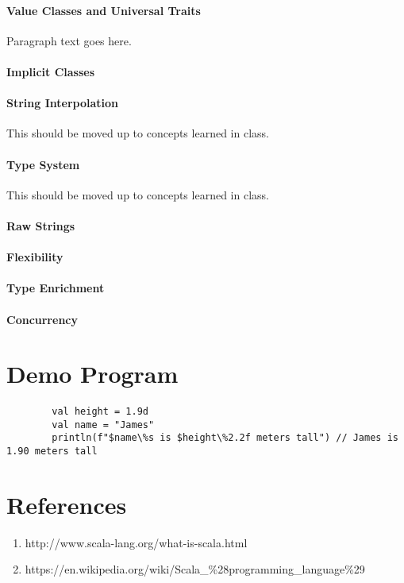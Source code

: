 \documentclass[12pt]{article}
\begin{document}
		\paragraph{Value Classes and Universal Traits} Paragraph text goes here.

		\paragraph{Implicit Classes}

		\paragraph{String Interpolation} This should be moved up to concepts learned in class.

		\paragraph{Type System}This should be moved up to concepts learned in class.
		
		\paragraph{Raw Strings}

		\paragraph{Flexibility}

		\paragraph{Type Enrichment}

		\paragraph{Concurrency}

\section{Demo Program}
	\paragraph{}

	\begin{lstlisting}
		val height = 1.9d
		val name = "James"
		println(f"$name\%s is $height\%2.2f meters tall") // James is 1.90 meters tall
	\end{lstlisting}
\section{References}
	\begin{enumerate}
		\item
			http://www.scala-lang.org/what-is-scala.html
		\item
			https://en.wikipedia.org/wiki/Scala\_\%28programming\_language\%29
	\end{enumerate}
\end{document}
